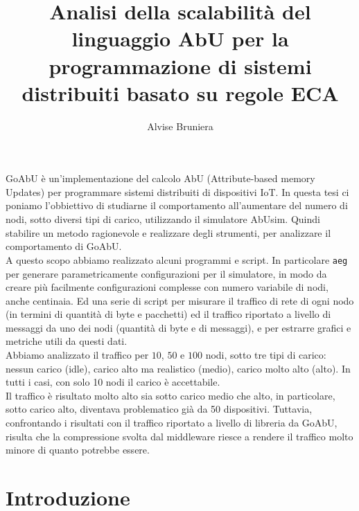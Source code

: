 \documentclass[target=bach]{thud}
\title{Analisi della scalabilità del linguaggio AbU per la programmazione di sistemi distribuiti basato su regole ECA}
\author{Alvise Bruniera}
\newcommand{\aeg}[0]{{\lstinline{aeg}}\xspace}
\begin{document}
\maketitle

\abstract
GoAbU è un'implementazione del calcolo AbU (Attribute-based memory Updates) per programmare sistemi distribuiti di dispositivi IoT. In questa tesi ci poniamo l'obbiettivo di studiarne il comportamento all'aumentare del numero di nodi, sotto diversi tipi di carico, utilizzando il simulatore AbUsim. Quindi stabilire un metodo ragionevole e realizzare degli strumenti, per analizzare il comportamento di GoAbU.\\
A questo scopo abbiamo realizzato alcuni programmi e script. In particolare \aeg per generare parametricamente configurazioni per il simulatore, in modo da creare più facilmente configurazioni complesse con numero variabile di nodi, anche centinaia. Ed una serie di script per misurare il traffico di rete di ogni nodo (in termini di quantità di byte e pacchetti) ed il traffico riportato a livello di messaggi da uno dei nodi (quantità di byte e di messaggi), e per estrarre grafici e metriche utili da questi dati.\\
Abbiamo analizzato il traffico per $10$, $50$ e $100$ nodi, sotto tre tipi di carico: nessun carico (idle), carico alto ma realistico (medio), carico molto alto (alto). In tutti i casi, con solo 10 nodi il carico è accettabile.\\
Il traffico è risultato molto alto sia sotto carico medio che alto, in particolare, sotto carico alto, diventava problematico già da 50 dispositivi. Tuttavia, confrontando i risultati con il traffico riportato a livello di libreria da GoAbU, risulta che la compressione svolta dal middleware riesce a rendere il traffico molto minore di quanto potrebbe essere.
\tableofcontents



\mainmatter

\chapter{Introduzione}
\end{document}
